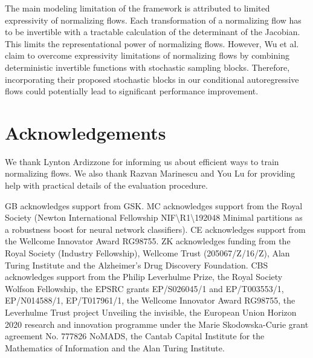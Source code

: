 The main modeling limitation of the framework is attributed to limited expressivity of normalizing flows. Each transformation of a normalizing flow has to be invertible with a tractable calculation of the determinant of the Jacobian. This limits the representational power of normalizing flows. However, Wu et al. \cite{wu2020stochastic} claim to overcome expressivity limitations of normalizing flows by combining deterministic invertible functions with stochastic sampling blocks. Therefore, incorporating their proposed stochastic blocks in our conditional autoregressive flows could potentially lead to significant performance improvement. 

\section*{Acknowledgements}
We thank Lynton Ardizzone for informing us about efficient ways to train normalizing flows. We also thank Razvan Marinescu and You Lu for providing help with practical details of the evaluation procedure.

GB acknowledges support from GSK. 
MC acknowledges support from the Royal Society (Newton International Fellowship NIF\textbackslash R1\textbackslash 192048 Minimal partitions as a robustness boost for neural network classifiers).
CE acknowledges support from the Wellcome Innovator Award RG98755. ZK acknowledges funding from the Royal Society (Industry Fellowship), Wellcome Trust (205067/Z/16/Z), Alan Turing Institute and the Alzheimer’s Drug Discovery Foundation.
CBS acknowledges support from the Philip Leverhulme Prize, the Royal Society Wolfson Fellowship, the EPSRC grants EP/S026045/1 and EP/T003553/1, EP/N014588/1, EP/T017961/1, the Wellcome Innovator Award RG98755, the Leverhulme Trust project Unveiling the invisible, the European Union Horizon 2020 research and innovation programme under the Marie Skodowska-Curie grant agreement No. 777826 NoMADS, the Cantab Capital Institute for the Mathematics of Information and the Alan Turing Institute.

